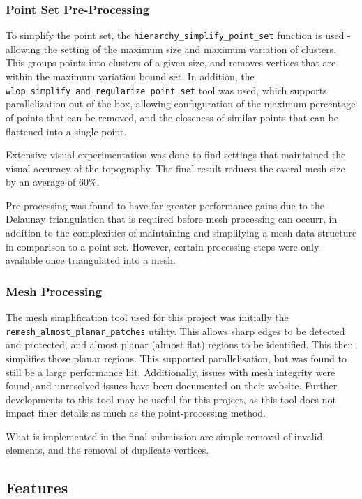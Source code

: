 \documentclass[12pt]{article}
\begin{document}
\subsubsection{Point Set Pre-Processing}

To simplify the point set, the \texttt{hierarchy\_simplify\_point\_set} function is used - allowing the setting of the maximum size and maximum variation of clusters. This groups points into clusters of a given size, and removes vertices that are within the maximum variation bound set. In addition, the \texttt{wlop\_simplify\_and\_regularize\_point\_set} tool was used, which supports parallelization out of the box, allowing confuguration of the maximum percentage of points that can be removed, and the closeness of similar points that can be flattened into a single point.

Extensive visual experimentation was done to find settings that maintained the visual accuracy of the topography. The final result reduces the overal mesh size by an average of 60\%.

Pre-processing was found to have far greater performance gains due to the Delaunay triangulation that is required before mesh processing can occurr, in addition to the complexities of maintaining and simplifying a mesh data structure in comparison to a point set. However, certain processing steps were only available once triangulated into a mesh.

\subsubsection{Mesh Processing}

The mesh simplification tool used for this project was initially the \texttt{remesh\_almost\_planar\_patches} utility. This allows sharp edges to be detected and protected, and almost planar (almost flat) regions to be identified. This then simplifies those planar regions. This supported parallelisation, but was found to still be a large performance hit. Additionally, issues with mesh integrity were found, and unresolved issues have been documented on their website. Further developments to this tool may be useful for this project, as this tool does not impact finer details as much as the point-processing method.

What is implemented in the final submission are simple removal of invalid elements, and the removal of duplicate vertices.

\subsection{Features}
\end{document}
